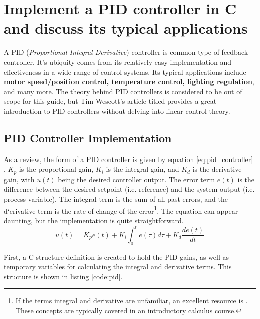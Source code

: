 \documentclass[main.tex]{subfiles}
\begin{document}
\section{Implement a PID controller in C and discuss its typical applications}

\spoilerline

\noindent A PID (\textit{Proportional-Integral-Derivative}) controller is common type of feedback controller. It's ubiquity comes from its relatively easy implementation and effectiveness in a wide range of control systems. Its typical applications include \textbf{motor speed/position control, temperature control, lighting regulation}, and many more. The theory behind PID controllers is considered to be out of scope for this guide, but Tim Wescott's article titled  provides a great introduction to PID controllers without delving into linear control theory.

\subsection{PID Controller Implementation}
As a review, the form of a PID controller is given by equation \eqref{eq:pid_controller} \cite{AbramovitchPID}. $K_p$ is the proportional gain, $K_i$ is the integral gain, and $K_d$ is the derivative gain, with $u(t)$ being the desired controller output. The error term $e(t)$ is the difference between the desired setpoint (i.e. reference) and the system output (i.e. process variable). The integral term is the sum of all past errors, and the d`erivative term is the rate of change of the error\footnote{If the terms integral and derivative are unfamiliar, an excellent resource is . These concepts are typically covered in an introductory calculus course.}. The equation can appear daunting, but the implementation is quite straightforward.
\begin{equation}
    u(t) = K_p e(t) + K_i \int_{0}^{t} e(\tau) d\tau + K_d \frac{de(t)}{dt}
    \label{eq:pid_controller}
\end{equation}

\noindent First, a C structure definition is created to hold the PID gains, as well as temporary variables for calculating the integral and derivative terms. This structure is shown in listing \ref{code:pid}.

\end{document}
